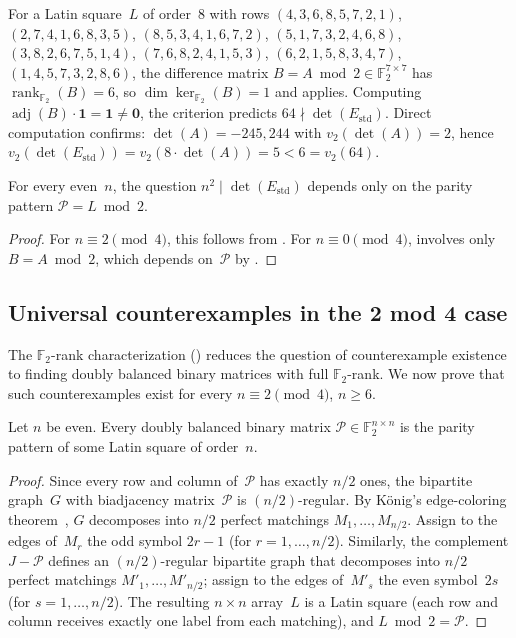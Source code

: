 \documentclass[11pt,a4paper]{article}
\newcommand{\FF}{\mathbb{F}}
\newcommand{\one}{\mathbf{1}}
\newcommand{\rank}{\operatorname{rank}}
\newcommand{\adj}{\operatorname{adj}}
\newcommand{\Estd}{E_{\mathrm{std}}}
\begin{document}
\begin{example}\label{ex:adj-n8}
\sloppy
For a Latin square~$L$ of order~$8$ with rows
$(4,3,6,8,5,7,2,1)$, $(2,7,4,1,6,8,3,5)$,
$(8,5,3,4,1,6,7,2)$, $(5,1,7,3,2,4,6,8)$,
$(3,8,2,6,7,5,1,4)$, $(7,6,8,2,4,1,5,3)$,
$(6,2,1,5,8,3,4,7)$, $(1,4,5,7,3,2,8,6)$,
the difference matrix $B=A\bmod 2\in\FF_2^{7\times 7}$
has $\rank_{\FF_2}(B)=6$,
so $\dim\ker_{\FF_2}(B)=1$ and  applies.
Computing $\adj(B)\cdot\one=\one\neq\mathbf{0}$, the criterion
predicts $64\nmid\det(\Estd)$.
Direct computation confirms: $\det(A)=-245{,}244$
with $v_2(\det(A))=2$, hence
$v_2(\det(\Estd))=v_2(8\cdot\det(A))=5<6=v_2(64)$.
\end{example}

\begin{corollary}\label{cor:parity-complete}
For every even~$n$, the question $n^2\mid\det(\Estd)$ depends only on
the parity pattern $\mathcal{P}=L\bmod 2$.
\end{corollary}

\begin{proof}
For $n\equiv 2\pmod{4}$, this follows from
.
For $n\equiv 0\pmod{4}$,  involves
only $B=A\bmod 2$, which depends on~$\mathcal{P}$
by .
\end{proof}

\subsection{Universal counterexamples in the 2 mod 4 case}

The $\FF_2$-rank characterization ()
reduces the question of counterexample existence to finding doubly
balanced binary matrices with full $\FF_2$-rank.  We now prove that
such counterexamples exist for every $n\equiv 2\pmod{4}$, $n\ge 6$.

\begin{proposition}\label{prop:balanced-lift}
Let $n$ be even.  Every doubly balanced binary matrix
$\mathcal{P}\in\FF_2^{n\times n}$ is the parity pattern of some Latin
square of order~$n$.
\end{proposition}

\begin{proof}
Since every row and column of~$\mathcal{P}$ has exactly $n/2$ ones,
the bipartite graph~$G$ with biadjacency matrix~$\mathcal{P}$ is
$(n/2)$-regular.  By K\"onig's edge-coloring theorem~\cite{Konig16},
$G$ decomposes into $n/2$ perfect matchings $M_1,\dots,M_{n/2}$.
Assign to the edges of~$M_r$ the odd symbol $2r-1$
(for $r=1,\dots,n/2$).  Similarly, the complement
$J-\mathcal{P}$ defines an $(n/2)$-regular bipartite graph that
decomposes into $n/2$ perfect matchings $M'_1,\dots,M'_{n/2}$;
assign to the edges of~$M'_s$ the even symbol~$2s$
(for $s=1,\dots,n/2$).  The resulting $n\times n$ array~$L$ is a Latin
square (each row and column receives exactly one label from each
matching), and $L\bmod 2 = \mathcal{P}$.
\end{proof}
\end{document}
